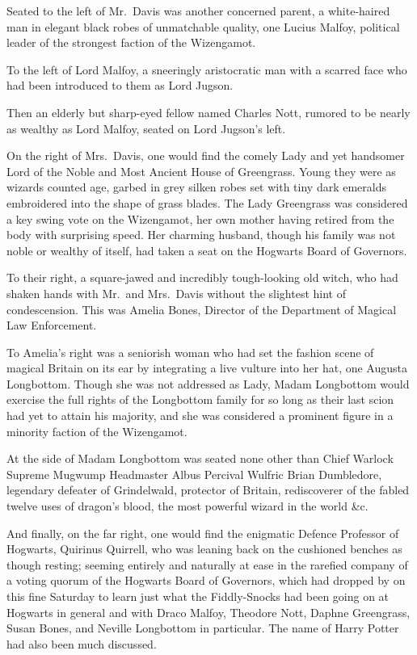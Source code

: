 Seated to the left of Mr.~Davis was another concerned parent, a white-haired
man in elegant black robes of unmatchable quality, one Lucius Malfoy, political
leader of the strongest faction of the Wizengamot.

To the left of Lord Malfoy, a sneeringly aristocratic man with a scarred face
who had been introduced to them as Lord Jugson.

Then an elderly but sharp-eyed fellow named Charles Nott, rumored to be nearly
as wealthy as Lord Malfoy, seated on Lord Jugson's left.

On the right of Mrs.~Davis, one would find the comely Lady and yet handsomer
Lord of the Noble and Most Ancient House of Greengrass. Young they were as
wizards counted age, garbed in grey silken robes set with tiny dark emeralds
embroidered into the shape of grass blades. The Lady Greengrass was considered
a key swing vote on the Wizengamot, her own mother having retired from the body
with surprising speed. Her charming husband, though his family was not noble or
wealthy of itself, had taken a seat on the Hogwarts Board of Governors.

To their right, a square-jawed and incredibly tough-looking old witch, who had
shaken hands with Mr.~and Mrs.~Davis without the slightest hint of
condescension. This was Amelia Bones, Director of the Department of Magical Law
Enforcement.

To Amelia's right was a seniorish woman who had set the fashion scene of
magical Britain on its ear by integrating a live vulture into her hat, one
Augusta Longbottom. Though she was not addressed as Lady, Madam Longbottom
would exercise the full rights of the Longbottom family for so long as their
last scion had yet to attain his majority, and she was considered a prominent
figure in a minority faction of the Wizengamot.

At the side of Madam Longbottom was seated none other than Chief Warlock
Supreme Mugwump Headmaster Albus Percival Wulfric Brian Dumbledore, legendary
defeater of Grindelwald, protector of Britain, rediscoverer of the fabled
twelve uses of dragon's blood, the most powerful wizard in the world \&c.

And finally, on the far right, one would find the enigmatic Defence Professor
of Hogwarts, Quirinus Quirrell, who was leaning back on the cushioned benches
as though resting; seeming entirely and naturally at ease in the rarefied
company of a voting quorum of the Hogwarts Board of Governors, which had
dropped by on this fine Saturday to learn just what the Fiddly-Snocks had been
going on at Hogwarts in general and with Draco Malfoy, Theodore Nott, Daphne
Greengrass, Susan Bones, and Neville Longbottom in particular. The name of
Harry Potter had also been much discussed.

